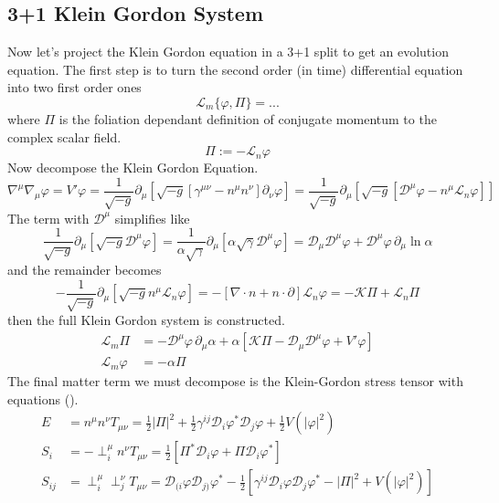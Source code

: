 \documentclass[11pt, oneside]{report}  %
\newcommand{\D}{\mathcal{D}}
\newcommand{\K}{\mathcal{K}}
\renewcommand{\L}{\mathcal{L}}
\newcommand{\vp}{\varphi}
\numberwithin{equation}{section}
\begin{document}
\subsection{3+1 Klein Gordon System}
Now let's project the Klein Gordon equation in a 3+1 split to get an evolution equation. The first step is to turn the second order (in time) differential equation into two first order ones
\begin{equation} \L_m \{\vp,\Pi \} = ...\end{equation}
where $\Pi$ is the foliation dependant definition of conjugate momentum to the complex scalar field.
\begin{equation} \Pi:= -\L_n \vp\end{equation}
Now decompose the Klein Gordon Equation.
\begin{equation} \nabla^\mu \nabla_\mu \vp = V' \vp = \frac{1}{\sqrt{-g}} \partial_\mu \left[ \sqrt{-g}\left[\gamma^{\mu\nu}-n^\mu n^\nu\right]\partial_\nu \vp\right] = \frac{1}{\sqrt{-g}} \partial_\mu \left[ \sqrt{-g}\left[\D^\mu\vp-n^\mu \L_n\vp\right]\right] \end{equation}
The term with $\D^\mu$ simplifies like
\begin{equation}\frac{1}{\sqrt{-g}} \partial_\mu \left[ \sqrt{-g}\D^\mu\vp\right] =  \frac{1}{\alpha\sqrt{\gamma}} \partial_\mu \left[\alpha\sqrt{\gamma}\D^\mu\vp\right]  = \D_\mu \D^\mu \vp + \D^\mu \vp \,\partial_\mu \ln \alpha\end{equation}
and the remainder becomes
\begin{equation}-\frac{1}{\sqrt{-g}} \partial_\mu \left[ \sqrt{-g}n^\mu \L_n\vp\right] = -\left[\nabla \cdot n + n\cdot \partial\right]\L_n\vp = -\K\Pi + \L_n \Pi\end{equation}
then the full Klein Gordon system is constructed.
\begin{align}
 \L_m \Pi &= - \D^\mu\vp\,\partial_\mu \alpha+\alpha\left[\K\Pi - \D_\mu \D^\mu \vp  + V'\vp\right] \\
 \L_m \vp &= - \alpha\Pi\end{align}
The final matter term we must decompose is the Klein-Gordon stress tensor with equations (). \begin{align} E &=n^\mu n^\nu T_{\mu\nu} = \frac{1}{2}|\Pi|^2 + \frac{1}{2}\gamma^{ij}\D_i \varphi^* \D_j \varphi +\frac{1}{2}V(|\varphi|^2)
\\ S_i &= -\perp^\mu_i n^\nu T_{\mu\nu} =  \frac{1}{2}\left[\Pi^* \D_i \vp  +  \Pi\D_i \vp^* \right]
\\ S_{ij} &= \perp^\mu_i \perp^\nu_j T_{\mu\nu} = \D_{(i}\vp\D_{j)}\vp^* - \frac{1}{2}\left[ \gamma^{ij}\D_i\vp\D_j\vp^* - |\Pi|^2 + V(|\vp|^2)\right]\end{align}
\end{document}
